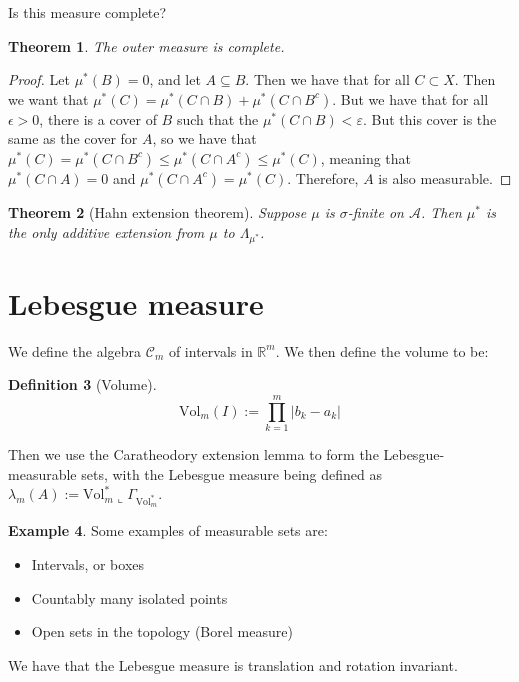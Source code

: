 \documentclass{article}
\newtheorem{theorem}{Theorem}
\newtheorem{definition}[theorem]{Definition}
\theoremstyle{definition}
\newtheorem{example}[theorem]{Example}
\numberwithin{theorem}{section}
\numberwithin{equation}{section}
\newcommand{\alg}{\mathcal{A}}
\begin{document}
Is this measure complete?
\begin{theorem}
	The outer measure is complete.
\end{theorem}
\begin{proof}
	Let $\mu^*(B) = 0$, and let $A \subseteq B$. Then we have that for all $C \subset X$. Then we want that $\mu^*(C) = \mu^*(C \cap B) + \mu^*(C \cap B^c)$. But we have that for all $\epsilon > 0$, there is a cover of $B$ such that the $\mu^*(C \cap B) < \varepsilon$. But this cover is the same as the cover for $A$, so we have that $ \mu^*(C) = \mu^*(C \cap B^c) \leq \mu^*(C \cap A^c) \leq \mu^*(C)$, meaning that $ \mu^*(C \cap A) = 0$ and $\mu^*(C \cap A^c) = \mu^*(C)$. Therefore, $A$ is also measurable. 
\end{proof}

\begin{theorem}[Hahn extension theorem]
	Suppose $\mu$ is $\sigma$-finite on $\alg$. Then $\mu^*$ is the only additive extension from $\mu$ to $\Lambda_{\mu^*}$. 
\end{theorem}

\section{Lebesgue measure}
We define the algebra $\mathcal{C}_m$ of intervals in $\mathbb{R}^m$. We then define the volume to be:
\begin{definition}[Volume]
	\begin{equation*}
		\text{Vol}_m(I) := \prod_{k = 1}^m |b_k - a_k|
	\end{equation*}
\end{definition}

Then we use the Caratheodory extension lemma to form the Lebesgue-measurable sets, with the Lebesgue measure being defined as $\lambda_m(A) := \text{Vol}_m^*\llcorner \Gamma_{\text{Vol}_m^*}$.

\begin{example}
	Some examples of measurable sets are:
	\begin{itemize}
		\item Intervals, or boxes
		\item Countably many isolated points
		\item Open sets in the topology (Borel measure)
	\end{itemize}
\end{example}
We have that the Lebesgue measure is translation and rotation invariant.
\end{document}
